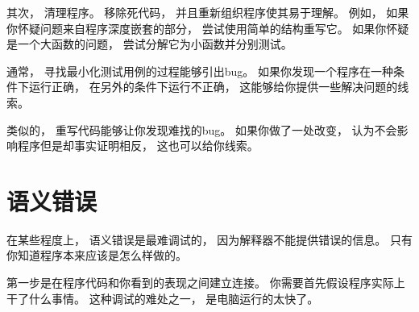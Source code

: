 其次， 清理程序。  
移除死代码， 并且重新组织程序使其易于理解。  
例如， 如果你怀疑问题来自程序深度嵌套的部分， 尝试使用简单的结构重写它。  如果你怀疑是一个大函数的问题， 尝试分解它为小函数并分别测试。  


通常， 寻找最小化测试用例的过程能够引出bug。  
如果你发现一个程序在一种条件下运行正确， 在另外的条件下运行不正确， 这能够给你提供一些解决问题的线索。  


类似的， 重写代码能够让你发现难找的bug。  
如果你做了一处改变， 认为不会影响程序但是却事实证明相反， 这也可以给你线索。  


\section{语义错误}


在某些程度上， 语义错误是最难调试的， 因为解释器不能提供错误的信息。  只有你知道程序本来应该是怎么样做的。  


第一步是在程序代码和你看到的表现之间建立连接。  你需要首先假设程序实际上干了什么事情。  这种调试的难处之一， 是电脑运行的太快了。  


